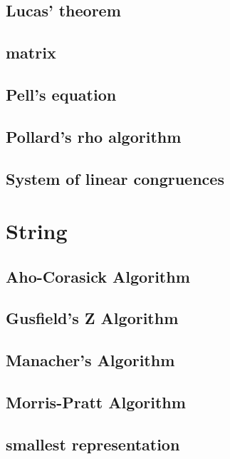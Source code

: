 \documentclass[a4paper,5pt,twocolumn,titlepage]{article}
\begin{document}
\subsection{Lucas' theorem}

\subsection{matrix}

\subsection{Pell's equation}

\subsection{Pollard's rho algorithm}

\subsection{System of linear congruences}



\section{String}
\subsection{Aho-Corasick Algorithm}

\subsection{Gusfield's Z Algorithm}

\subsection{Manacher's Algorithm}

\subsection{Morris-Pratt Algorithm}

\subsection{smallest representation}

\end{document}
